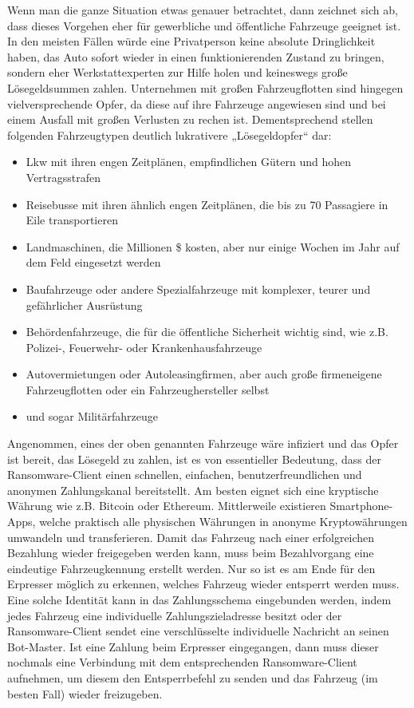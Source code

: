 Wenn man die ganze Situation etwas genauer betrachtet, dann zeichnet sich ab, dass dieses 
Vorgehen eher für gewerbliche und öffentliche Fahrzeuge geeignet ist. In den meisten Fällen 
würde eine Privatperson keine absolute Dringlichkeit haben, das Auto sofort wieder in einen 
funktionierenden Zustand zu bringen, sondern eher Werkstattexperten zur Hilfe holen und 
keineswegs große Lösegeldsummen zahlen. 
\newline
Unternehmen mit großen Fahrzeugflotten sind hingegen vielversprechende Opfer, da diese auf 
ihre Fahrzeuge angewiesen sind und bei einem Ausfall mit großen Verlusten zu rechen ist. 
Dementsprechend stellen folgenden Fahrzeugtypen deutlich lukrativere „Lösegeldopfer“ dar:

\begin{itemize}
    \item Lkw mit ihren engen Zeitplänen, empfindlichen Gütern und hohen Vertragsstrafen
    \item Reisebusse mit ihren ähnlich engen Zeitplänen, die bis zu 70 Passagiere in Eile transportieren
    \item Landmaschinen, die Millionen \$ kosten, aber nur einige Wochen im Jahr auf dem Feld eingesetzt werden
    \item Baufahrzeuge oder andere Spezialfahrzeuge mit komplexer, teurer und gefährlicher Ausrüstung
    \item Behördenfahrzeuge, die für die öffentliche Sicherheit wichtig sind, wie z.B. Polizei-, Feuerwehr- oder Krankenhausfahrzeuge
    \item Autovermietungen oder Autoleasingfirmen, aber auch große firmeneigene Fahrzeugflotten oder ein Fahrzeughersteller selbst
    \item und sogar Militärfahrzeuge
\end{itemize}

Angenommen, eines der oben genannten Fahrzeuge wäre infiziert und das Opfer ist bereit, 
das Lösegeld zu zahlen, ist es von essentieller Bedeutung, dass der Ransomware-Client einen 
schnellen, einfachen, benutzerfreundlichen und anonymen Zahlungskanal bereitstellt. Am besten 
eignet sich eine kryptische Währung wie z.B. Bitcoin oder Ethereum. Mittlerweile existieren 
Smartphone-Apps, welche praktisch alle physischen Währungen in anonyme Kryptowährungen 
umwandeln und transferieren.
\newline
Damit das Fahrzeug nach einer erfolgreichen Bezahlung wieder freigegeben werden kann, muss 
beim Bezahlvorgang eine eindeutige Fahrzeugkennung erstellt werden. Nur so ist es am Ende 
für den Erpresser möglich zu erkennen, welches Fahrzeug wieder entsperrt werden muss. Eine 
solche Identität kann in das Zahlungsschema eingebunden werden, indem jedes Fahrzeug eine 
individuelle Zahlungszieladresse besitzt oder der Ransomware-Client sendet eine verschlüsselte 
individuelle Nachricht an seinen Bot-Master.
\newline
Ist eine Zahlung beim Erpresser eingegangen, dann muss dieser nochmals eine Verbindung mit 
dem entsprechenden Ransomware-Client aufnehmen, um diesem den Entsperrbefehl zu senden und 
das Fahrzeug (im besten Fall) wieder freizugeben.  
